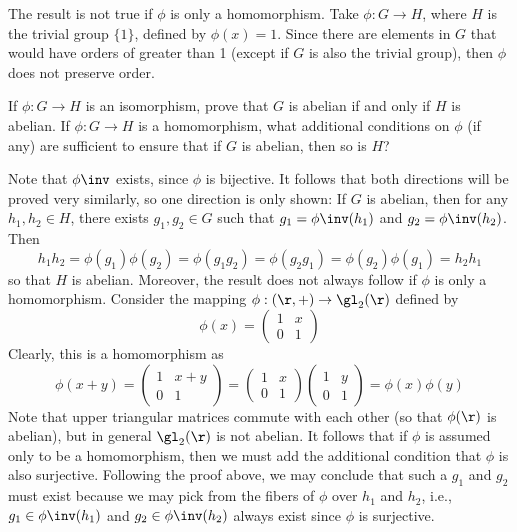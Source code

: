 \begin{problems}
\begin{sol}
        The result is not true if $\phi$ is only a homomorphism. Take $\phi : G \to H$, where $H$ is the trivial group $\{1\}$, defined by $\phi(x) = 1$. Since there are elements in $G$ that would have orders of greater than 1 (except if $G$ is also the trivial group), then $\phi$ does not preserve order.
    \end{sol}
    \item If $\phi : G \to H$ is an isomorphism, prove that $G$ is abelian if and only if $H$ is abelian. If $\phi : G \to H$ is a homomorphism, what additional conditions on $\phi$ (if any) are sufficient to ensure that if $G$ is abelian, then so is $H$?
    \begin{sol}
        Note that $\phi\inv$ exists, since $\phi$ is bijective. It follows that both directions will be proved very similarly, so one direction is only shown: If $G$ is abelian, then for any $h_1, h_2 \in H$, there exists $g_1, g_2 \in G$ such that $g_1 = \phi\inv(h_1)$ and $g_2 = \phi\inv(h_2)$. Then
        \[h_1h_2 = \phi(g_1)\phi(g_2) = \phi(g_1g_2) = \phi(g_2g_1) = \phi(g_2)\phi(g_1) = h_2h_1\]
        so that $H$ is abelian. Moreover, the result does not always follow if $\phi$ is only a homomorphism. Consider the mapping $\phi : (\r, +) \to \gl_2(\r)$ defined by
        \[\phi(x) = 
        \begin{pmatrix}
            1 & x \\
            0 & 1
        \end{pmatrix}\]
        Clearly, this is a homomorphism as
        \[\phi(x + y) = 
        \begin{pmatrix}
            1 & x + y \\
            0 & 1
        \end{pmatrix} = 
        \begin{pmatrix}
            1 & x \\
            0 & 1
        \end{pmatrix}
        \begin{pmatrix}
            1 & y \\
            0 & 1
        \end{pmatrix} = \phi(x)\phi(y)\]
        Note that upper triangular matrices commute with each other (so that $\phi(\r)$ is abelian), but in general $\gl_2(\r)$ is not abelian. It follows that if $\phi$ is assumed only to be a homomorphism, then we must add the additional condition that $\phi$ is also surjective. Following the proof above, we may conclude that such a $g_1$ and $g_2$ must exist because we may pick from the fibers of $\phi$ over $h_1$ and $h_2$, i.e., $g_1 \in \phi\inv(h_1)$ and $g_2 \in \phi\inv(h_2)$ always exist since $\phi$ is surjective.

\end{sol}
\end{problems}
